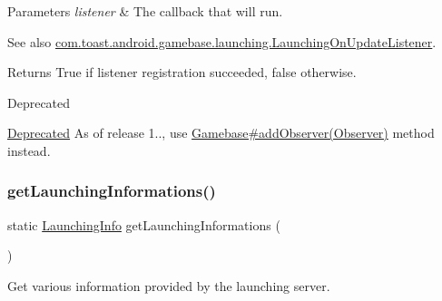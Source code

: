 \begin{DoxyParams}{Parameters}
{\em listener} & The callback that will run. \\
\hline
\end{DoxyParams}
\begin{DoxySeeAlso}{See also}
\hyperlink{}{com.\+toast.\+android.\+gamebase.\+launching.\+Launching\+On\+Update\+Listener}. 
\end{DoxySeeAlso}
\begin{DoxyReturn}{Returns}
True if listener registration succeeded, false otherwise. 
\end{DoxyReturn}
\begin{DoxyRefDesc}{Deprecated}
\item[\hyperlink{deprecated__deprecated000003}{Deprecated}]As of release 1.., use \hyperlink{classcom_1_1toast_1_1android_1_1gamebase_1_1_gamebase_a9079ec835df5660d8b19a1fd3eb0d9d8}{Gamebase\#add\+Observer(\+Observer)} method instead. \end{DoxyRefDesc}
\mbox{\label{classcom_1_1toast_1_1android_1_1gamebase_1_1_gamebase_1_1_launching_a93ab4a06b72866dace784957cbf218c0}} 
\subsubsection{\texorpdfstring{get\+Launching\+Informations()}{getLaunchingInformations()}}
{\footnotesize\ttfamily static \hyperlink{classcom_1_1toast_1_1android_1_1gamebase_1_1launching_1_1data_1_1_launching_info}{Launching\+Info} get\+Launching\+Informations (\begin{DoxyParamCaption}{ }\end{DoxyParamCaption})\hspace{0.3cm}{\ttfamily [static]}}



Get various information provided by the launching server. 

